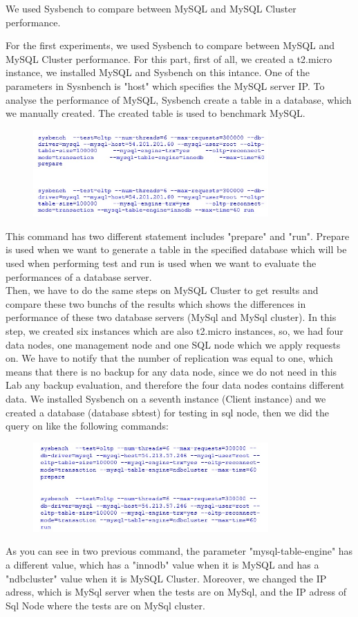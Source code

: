 \documentclass[10pt, conference]{IEEEtran}
\begin{document}
\indent We used Sysbench to compare between MySQL and MySQL Cluster performance.

\indent For the first experiments, we used Sysbench to compare between MySQL and MySQL Cluster performance. For this part, first of all, we created a t2.micro instance, we installed MySQL and Sysbench on this intance. One of the parameters in Sysnbench is "host" which specifies the MySQL server IP. To analyse the performance of MySQL, Sysbench create a table in a database, which we manually created. The created table is used to benchmark MySQL.
\begin{figure}[h!]
	\centering
	\includegraphics[width=9cm]{figure5.jpg}
\end{figure} 
\indent This command has two different statement includes "prepare" and "run". Prepare is used when we want to generate a table in the specified database which will be used when performing test and run is used when we want to evaluate the performances of a database server.\\
\indent Then, we have to do the same steps on MySQL Cluster to get results and compare these two bunchs of the results which shows the differences in performance of these two database servers (MySql and MySql cluster). In this step, we created six instances which are also t2.micro instances, so, we had four data nodes, one management node and one SQL node which we apply requests on. We have to notify that the number of replication was equal to one, which means that there is no backup for any data node, since we do not need in this Lab any backup evaluation, and therefore the four data nodes contains different data. We installed Sysbench on a seventh instance (Client instance) and we created a database (database sbtest) for testing in sql node, then we did the query on like the following commands: \\
\begin{figure}[h!]
	\centering
	\includegraphics[width=9cm]{figure6.jpg}
\end{figure}
\indent As you can see in two previous command, the parameter "mysql-table-engine" has a different value, which has a "innodb" value when it is MySQL and has a "ndbcluster" value when it is MySQL Cluster. Moreover, we changed the IP adress, which is MySql server when the tests are on MySql, and the IP adress of Sql Node where the tests are on MySql cluster.
\end{document}
